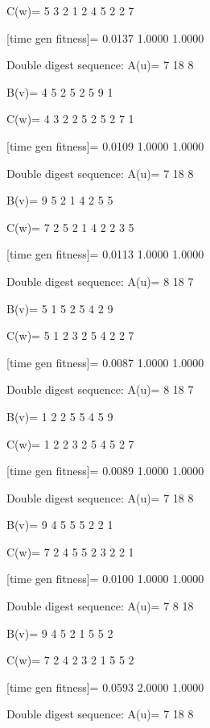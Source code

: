 C(w)=
     5     3     2     1     2     4     5     2     2     7

[time gen fitness]=
    0.0137    1.0000    1.0000

Double digest sequence:
A(u)=
     7    18     8

B(v)=
     4     5     2     5     2     5     9     1

C(w)=
     4     3     2     2     5     2     5     2     7     1

[time gen fitness]=
    0.0109    1.0000    1.0000

Double digest sequence:
A(u)=
     7    18     8

B(v)=
     9     5     2     1     4     2     5     5

C(w)=
     7     2     5     2     1     4     2     2     3     5

[time gen fitness]=
    0.0113    1.0000    1.0000

Double digest sequence:
A(u)=
     8    18     7

B(v)=
     5     1     5     2     5     4     2     9

C(w)=
     5     1     2     3     2     5     4     2     2     7

[time gen fitness]=
    0.0087    1.0000    1.0000

Double digest sequence:
A(u)=
     8    18     7

B(v)=
     1     2     2     5     5     4     5     9

C(w)=
     1     2     2     3     2     5     4     5     2     7

[time gen fitness]=
    0.0089    1.0000    1.0000

Double digest sequence:
A(u)=
     7    18     8

B(v)=
     9     4     5     5     5     2     2     1

C(w)=
     7     2     4     5     5     2     3     2     2     1

[time gen fitness]=
    0.0100    1.0000    1.0000

Double digest sequence:
A(u)=
     7     8    18

B(v)=
     9     4     5     2     1     5     5     2

C(w)=
     7     2     4     2     3     2     1     5     5     2

[time gen fitness]=
    0.0593    2.0000    1.0000

Double digest sequence:
A(u)=
     7    18     8

